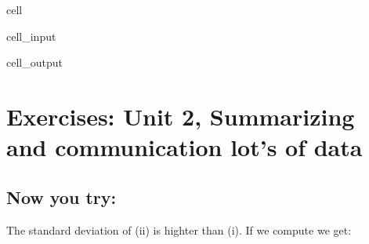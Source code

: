 \documentclass[letterpaper,10pt,english]{jupyterBook}
\begin{document}
\begin{sphinxuseclass}{cell}
\begin{sphinxVerbatimInput}
\begin{sphinxuseclass}{cell_input}
\end{sphinxuseclass}\end{sphinxVerbatimInput}
\begin{sphinxVerbatimOutput}

\begin{sphinxuseclass}{cell_output}
\noindent{}

\end{sphinxuseclass}\end{sphinxVerbatimOutput}

\end{sphinxuseclass}
\sphinxstepscope


\chapter{Exercises: Unit 2, Summarizing and communication lot’s of data}
\label{\detokenize{exercises_unit_2:exercises-unit-2-summarizing-and-communication-lot-s-of-data}}\label{\detokenize{exercises_unit_2::doc}}

\section{Now you try:}
\label{\detokenize{exercises_unit_2:now-you-try}}
\sphinxAtStartPar
The standard deviation of (ii) is highter than (i). If we compute we get:
\end{document}
